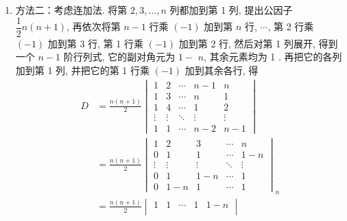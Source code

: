 \documentclass[UTF8,12pt,a4paper,fontset=fandol]{ctexart}
\begin{document}
\begin{solve}
\begin{enumerate}
\begin{enumerate}
                          \item 方法二：考虑连加法. 将第 $2,3, \ldots, n$ 列都加到第 1 列, 提出公因子 $\dfrac{1}{2} n(n+1)$, 再依次将第 $n-1$ 行乘 $(-1)$ 加到第 $n$ 行, $\cdots$, 第 2 行乘 $(-1)$ 加到第 3 行, 第 1 行乘 $(-1)$ 加到第 2 行, 然后对第 1 列展开, 得到一个 $n-1$ 阶行列式, 它的副对角元为 $1-$ $n$, 其余元素均为 1 . 再把它的各列加到第 1 列, 并把它的第 1 行乘 $(-1)$ 加到其余各行, 得
                                \begin{align*}
                                    D & =\frac{n(n+1)}{2}\begin{vmatrix}
                                                             1      & 2      & \cdots & n-1    & n      \\
                                                             1      & 3      & \cdots & n      & 1      \\
                                                             1      & 4      & \cdots & 1      & 2      \\
                                                             \vdots & \vdots & \ddots & \vdots & \vdots \\
                                                             1      & 1      & \cdots & n-2    & n-1
                                                         \end{vmatrix} \\
                                      & =\frac{n(n+1)}{2}\begin{vmatrix}
                                                             1      & 2      & 3      & \cdots & n      \\
                                                             0      & 1      & 1      & \cdots & 1-n    \\
                                                             \vdots & \vdots & \vdots & \ddots & \vdots \\
                                                             0      & 1      & 1-n    & \cdots & 1      \\
                                                             0      & 1-n    & 1      & \cdots & 1
                                                         \end{vmatrix}_{n} \\
                                      & =\frac{n(n+1)}{2}
                                    \begin{vmatrix}
                                        1      & 1      & \cdots & 1      & 1-n \\

\end{vmatrix}
\end{align*}
\end{enumerate}
\end{enumerate}
\end{solve}
\end{document}
